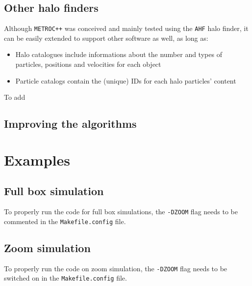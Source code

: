 \documentclass{article}
\begin{document}
\subsection{Other halo finders}

Although \texttt{METROC++} was conceived and mainly tested using the \texttt{AHF} halo finder, it can be easily extended to 
support other software as well, as long as:

\begin{itemize}
\item Halo catalogues include informations about the number and types of particles, positions and velocities for each object
\item Particle catalogs contain the (unique) IDs for each halo particles' content
\end{itemize}

To add 

\subsection{Improving the algorithms}

\section{Examples}

\subsection{Full box simulation}
To properly run the code for full box simulations, the \texttt{-DZOOM} flag needs to be commented in the \texttt{Makefile.config} file.

\subsection{Zoom simulation}
To properly run the code on zoom simulation, the \texttt{-DZOOM} flag needs to be switched on in the \texttt{Makefile.config} file.
\end{document}
